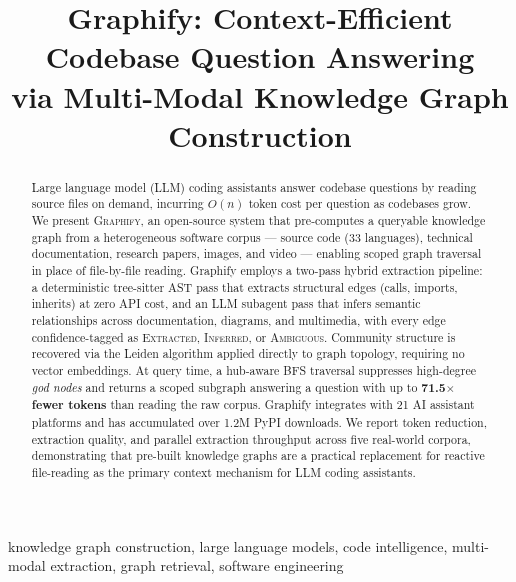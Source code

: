 \documentclass[conference]{IEEEtran}
\begin{document}
\title{Graphify: Context-Efficient Codebase Question Answering\\
via Multi-Modal Knowledge Graph Construction}

\author{
}

\maketitle

\begin{abstract}
Large language model (LLM) coding assistants answer codebase questions by
reading source files on demand, incurring $O(n)$ token cost per question
as codebases grow. We present \textsc{Graphify}, an open-source system that
pre-computes a queryable knowledge graph from a heterogeneous software corpus
--- source code (33 languages), technical documentation, research papers,
images, and video --- enabling scoped graph traversal in place of file-by-file
reading. Graphify employs a two-pass hybrid extraction pipeline: a deterministic
tree-sitter AST pass that extracts structural edges (calls, imports, inherits)
at zero API cost, and an LLM subagent pass that infers semantic relationships
across documentation, diagrams, and multimedia, with every edge confidence-tagged
as \textsc{Extracted}, \textsc{Inferred}, or \textsc{Ambiguous}. Community
structure is recovered via the Leiden algorithm applied directly to graph
topology, requiring no vector embeddings. At query time, a hub-aware BFS
traversal suppresses high-degree \emph{god nodes} and returns a scoped subgraph
answering a question with up to \textbf{71.5$\times$ fewer tokens} than reading
the raw corpus. Graphify integrates with 21 AI assistant platforms and has
accumulated over 1.2M PyPI downloads. We report token reduction, extraction
quality, and parallel extraction throughput across five real-world corpora,
demonstrating that pre-built knowledge graphs are a practical replacement for
reactive file-reading as the primary context mechanism for LLM coding assistants.
\end{abstract}

\begin{IEEEkeywords}
knowledge graph construction, large language models, code intelligence,
multi-modal extraction, graph retrieval, software engineering
\end{IEEEkeywords}









\end{document}
